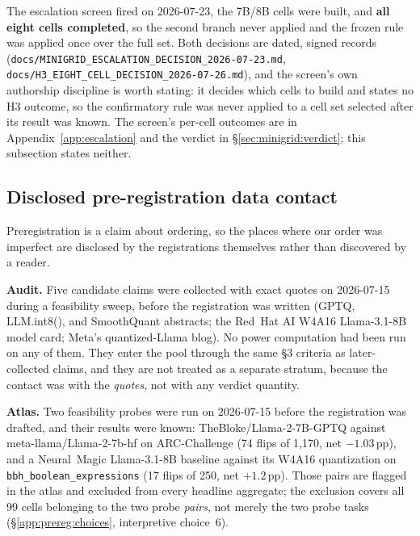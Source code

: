 The escalation screen fired on 2026-07-23, the 7B/8B cells were built, and
\textbf{all eight cells completed}, so the second branch never applied and the
frozen rule was applied once over the full set. Both decisions are dated, signed
records
(\texttt{docs/MINIGRID\_ESCALATION\_DECISION\_2026-07-23.md},
\texttt{docs/H3\_EIGHT\_CELL\_DECISION\_2026-07-26.md}), and the screen's own
authorship discipline is worth stating: it decides which cells to build and
states no H3 outcome, so the confirmatory rule was never applied to a cell set
selected after its result was known. The screen's per-cell outcomes are in
Appendix~\ref{app:escalation} and the verdict in
\S\ref{sec:minigrid:verdict}; this subsection states neither.

\subsection{Disclosed pre-registration data contact}
\label{app:prereg:contact}

Preregistration is a claim about ordering, so the places where our order was
imperfect are disclosed by the registrations themselves rather than discovered
by a reader.

\textbf{Audit.} Five candidate claims were collected with exact quotes on
2026-07-15 during a feasibility sweep, before the registration was written
(GPTQ, LLM.int8(), and SmoothQuant abstracts; the Red~Hat AI W4A16 Llama-3.1-8B
model card; Meta's quantized-Llama blog). No power computation had been run on
any of them. They enter the pool through the same §3 criteria as
later-collected claims, and they are not treated as a separate stratum, because
the contact was with the \emph{quotes}, not with any verdict quantity.

\textbf{Atlas.} Two feasibility probes were run on 2026-07-15 before the
registration was drafted, and their results were known: TheBloke/Llama-2-7B-GPTQ
against meta-llama/Llama-2-7b-hf on ARC-Challenge (74 flips of 1{,}170, net
$-1.03$\,pp), and a Neural~Magic Llama-3.1-8B baseline against its W4A16
quantization on \texttt{bbh\_boolean\_expressions} (17 flips of 250, net
$+1.2$\,pp). Those pairs are flagged in the atlas and excluded from every
headline aggregate; the exclusion covers all 99 cells belonging to the two probe
\emph{pairs}, not merely the two probe tasks (\S\ref{app:prereg:choices},
interpretive choice~6).

